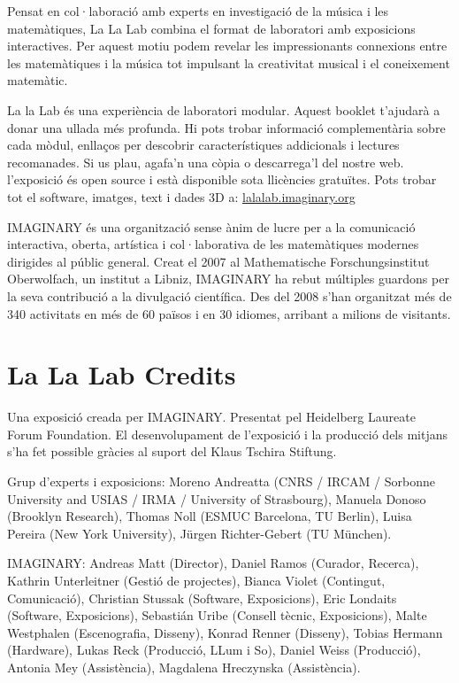 Pensat en col·laboració amb experts en investigació de la música i les matemàtiques, La La Lab combina el format de laboratori amb exposicions interactives. Per aquest motiu podem revelar les impressionants connexions entre les matemàtiques i la música tot impulsant la creativitat musical i el coneixement matemàtic.

La la Lab és una experiència de laboratori modular. Aquest booklet t'ajudarà a donar una ullada més profunda. Hi pots trobar informació complementària sobre cada mòdul, enllaços per descobrir característiques addicionals i lectures recomanades. Si us plau, agafa'n una còpia o descarrega'l del nostre web. l'exposició és open source i està disponible sota llicències gratuïtes. Pots trobar tot el software, imatges, text i dades 3D a: \url{lalalab.imaginary.org}

IMAGINARY és una organització sense ànim de lucre per a la comunicació interactiva, oberta, artística i col·laborativa de les matemàtiques modernes dirigides al públic general. Creat el 2007 al Mathematische Forschungsinstitut Oberwolfach, un institut a Libniz, IMAGINARY ha rebut múltiples guardons per la seva contribució a la divulgació científica. Des del 2008 s'han organitzat més de 340 activitats en més de 60 països i en 30 idiomes, arribant a milions de visitants. 


\section*{La La Lab Credits}
Una exposició creada per IMAGINARY.
Presentat pel Heidelberg Laureate Forum Foundation.
El desenvolupament de l'exposició i la producció dels mitjans s'ha fet possible gràcies al suport del Klaus Tschira Stiftung. 

Grup d'experts i exposicions:
Moreno Andreatta (CNRS / IRCAM / Sorbonne University and USIAS / IRMA / University of Strasbourg), Manuela Donoso (Brooklyn Research), Thomas Noll (ESMUC Barcelona, TU Berlin), Luisa Pereira (New York University), Jürgen Richter-Gebert (TU München).


IMAGINARY:
Andreas Matt (Director), Daniel Ramos (Curador, Recerca), Kathrin Unterleitner (Gestió de projectes), Bianca Violet (Contingut, Comunicació), Christian Stussak (Software, Exposicions), Eric Londaits (Software, Exposicions), Sebastián Uribe (Consell tècnic, Exposicions), Malte Westphalen (Escenografia, Disseny), Konrad Renner (Disseny), Tobias Hermann (Hardware), Lukas Reck (Producció, LLum i So), Daniel Weiss (Producció), Antonia Mey (Assistència), Magdalena Hreczynska (Assistència).

